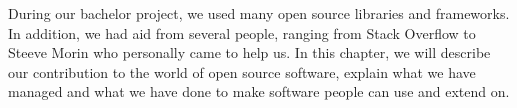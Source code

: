 During our bachelor project, we used many open source libraries and frameworks. In addition, we had aid from several people, ranging from Stack Overflow to Steeve Morin who personally came to help us. In this chapter, we will describe our contribution to the world of open source software, explain what we have managed and what we have done to make software people can use and extend on.